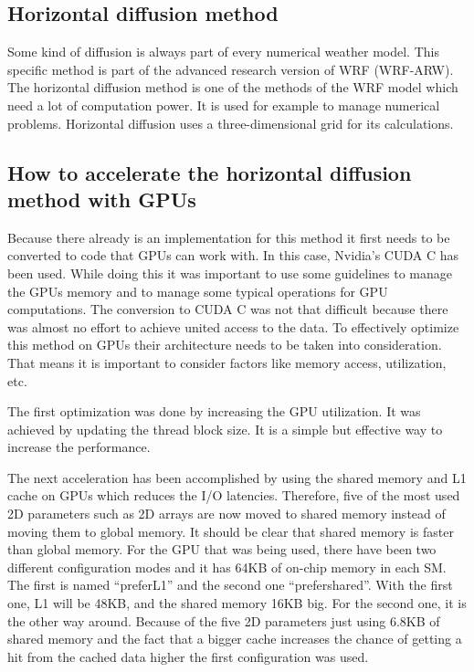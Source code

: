 \documentclass[conference]{IEEEtran}
\begin{document}
\vspace{\baselineskip}
\subsection{Horizontal diffusion method}
Some kind of diffusion is always part of every numerical weather model. This specific method is part of the advanced research version of WRF (WRF-ARW). The horizontal diffusion method is one of the methods of the WRF model which need a lot of computation power. It is used for example to manage numerical problems. Horizontal diffusion uses a three-dimensional grid for its calculations.\cite{b14}

\vspace{\baselineskip}
\subsection{How to accelerate the horizontal diffusion method with GPUs}
Because there already is an implementation for this method it first needs to be converted to code that GPUs can work with. In this case, Nvidia’s CUDA C has been used. While doing this it was important to use some guidelines to manage the GPUs memory and to manage some typical operations for GPU computations. The conversion to CUDA C was not that difficult because there was almost no effort to achieve united access to the data. To effectively optimize this method on GPUs their architecture needs to be taken into consideration. That means it is important to consider factors like memory access, utilization, etc.

The first optimization was done by increasing the GPU utilization. It was achieved by updating the thread block size. It is a simple but effective way to increase the performance.

The next acceleration has been accomplished by using the shared memory and L1 cache on GPUs which reduces the I/O latencies. Therefore, five of the most used 2D parameters such as 2D arrays are now moved to shared memory instead of moving them to global memory. It should be clear that shared memory is faster than global memory. For the GPU that was being used, there have been two different configuration modes and it has 64KB of on-chip memory in each SM. The first is named “preferL1” and the second one “prefershared”. With the first one, L1 will be 48KB, and the shared memory 16KB big. For the second one, it is the other way around. Because of the five 2D parameters just using 6.8KB of shared memory and the fact that a bigger cache increases the chance of getting a hit from the cached data higher the first configuration was used.
\end{document}

